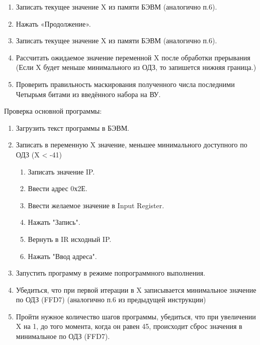 \begin{enumerate}
    \item Записать текущее значение X из памяти БЭВМ (аналогично п.6).
    \item Нажать «Продолжение».
    \item Записать текущее значение X из памяти БЭВМ (аналогично п.6).
    \item Рассчитать ожидаемое значение переменной X после обработки прерывания \\
    (Если X будет меньше минимального из ОДЗ, то запишется нижняя граница.)
    \item Проверить правильность маскирования полученного числа последними\\
    Четырьмя битами из введённого набора на ВУ.
\end{enumerate}
Проверка основной программы:
\begin{enumerate}
    \item Загрузить текст программы в БЭВМ.
    \item Записать в переменную X значение, меньшее минимального доступного по ОДЗ (X < -41)
    \begin{enumerate}
        \item Записать значение IP.
        \item Ввести адрес 0х2Е.
        \item Ввести желаемое значение в Input Register.
        \item Нажать "Запись".
        \item Вернуть в IR исходный IP.
        \item Нажать "Ввод адреса".
    \end{enumerate}
    \item Запустить программу в режиме попрограммного выполнения.
    \item Убедиться, что при первой итерации в X записывается минимальное значение по ОДЗ (FFD7) (аналогично п.6 из предыдущей инструкции)
    \item Пройти нужное количество шагов программы, убедиться, что при увеличении X на 1, до того момента, когда он равен 45, происходит сброс значения в
    минимальное по ОДЗ (FFD7).
\end{enumerate}

